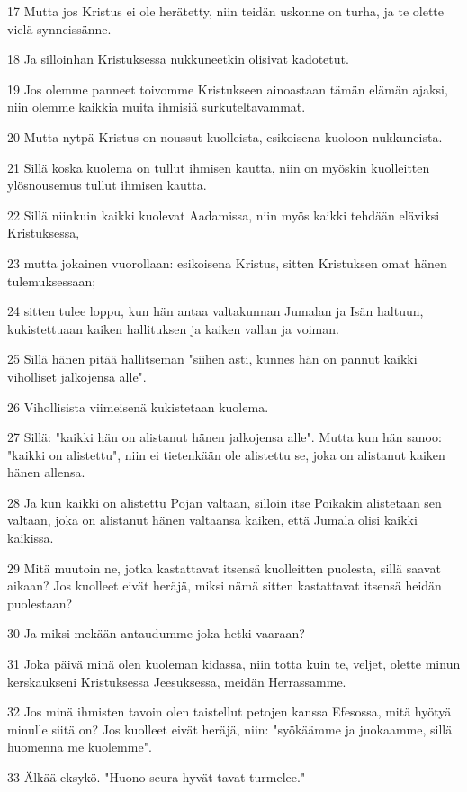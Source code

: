 \par 17 Mutta jos Kristus ei ole herätetty, niin teidän uskonne on turha, ja te olette vielä synneissänne.
\par 18 Ja silloinhan Kristuksessa nukkuneetkin olisivat kadotetut.
\par 19 Jos olemme panneet toivomme Kristukseen ainoastaan tämän elämän ajaksi, niin olemme kaikkia muita ihmisiä surkuteltavammat.
\par 20 Mutta nytpä Kristus on noussut kuolleista, esikoisena kuoloon nukkuneista.
\par 21 Sillä koska kuolema on tullut ihmisen kautta, niin on myöskin kuolleitten ylösnousemus tullut ihmisen kautta.
\par 22 Sillä niinkuin kaikki kuolevat Aadamissa, niin myös kaikki tehdään eläviksi Kristuksessa,
\par 23 mutta jokainen vuorollaan: esikoisena Kristus, sitten Kristuksen omat hänen tulemuksessaan;
\par 24 sitten tulee loppu, kun hän antaa valtakunnan Jumalan ja Isän haltuun, kukistettuaan kaiken hallituksen ja kaiken vallan ja voiman.
\par 25 Sillä hänen pitää hallitseman "siihen asti, kunnes hän on pannut kaikki viholliset jalkojensa alle".
\par 26 Vihollisista viimeisenä kukistetaan kuolema.
\par 27 Sillä: "kaikki hän on alistanut hänen jalkojensa alle". Mutta kun hän sanoo: "kaikki on alistettu", niin ei tietenkään ole alistettu se, joka on alistanut kaiken hänen allensa.
\par 28 Ja kun kaikki on alistettu Pojan valtaan, silloin itse Poikakin alistetaan sen valtaan, joka on alistanut hänen valtaansa kaiken, että Jumala olisi kaikki kaikissa.
\par 29 Mitä muutoin ne, jotka kastattavat itsensä kuolleitten puolesta, sillä saavat aikaan? Jos kuolleet eivät heräjä, miksi nämä sitten kastattavat itsensä heidän puolestaan?
\par 30 Ja miksi mekään antaudumme joka hetki vaaraan?
\par 31 Joka päivä minä olen kuoleman kidassa, niin totta kuin te, veljet, olette minun kerskaukseni Kristuksessa Jeesuksessa, meidän Herrassamme.
\par 32 Jos minä ihmisten tavoin olen taistellut petojen kanssa Efesossa, mitä hyötyä minulle siitä on? Jos kuolleet eivät heräjä, niin: "syökäämme ja juokaamme, sillä huomenna me kuolemme".
\par 33 Älkää eksykö. "Huono seura hyvät tavat turmelee."
